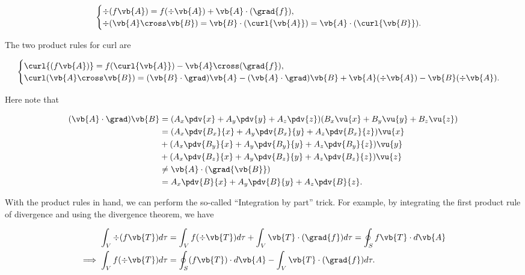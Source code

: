 \documentclass[english,a4paper,12pt]{report}
\begin{document}
\begin{equation}
\begin{cases} 
	\div{(f\vb{A})} = f(\div{\vb{A}}) + \vb{A} \cdot (\grad{f}), \\
	\div (\vb{A} \cross \vb{B}) = \vb{B} \cdot (\curl {\vb{A}}) = \vb{A} \cdot (\curl{\vb{B}}). 
\end{cases}
\end{equation}

	
The two product rules for curl are
	
\begin{equation}
\begin{cases} 
	\curl{(f\vb{A})} = f(\curl{\vb{A}}) - \vb{A} \cross (\grad{f}), \\
	\curl (\vb{A} \cross \vb{B}) = (\vb{B} \cdot \grad)\vb{A} - (\vb{A} \cdot \grad)\vb{B} + \vb{A}(\div{\vb{A}}) - \vb{B}(\div{\vb{A}}). 
\end{cases}
\end{equation}

	
Here note that

\begin{equation} 
	\begin{aligned} 
		(\vb{A} \cdot \grad) \vb{B} &= (A_x\pdv{x} + A_y\pdv{y} + A_z\pdv{z})(B_x\vu{x} + B_y\vu{y} + B_z\vu{z}) \\ &= (A_x\pdv{B_x}{x} + A_y\pdv{B_x}{y} + A_z\pdv{B_x}{z})\vu{x} \\ &+ (A_x\pdv{B_y}{x} + A_y\pdv{B_y}{y} + A_z\pdv{B_y}{z})\vu{y} \\ &+ (A_x\pdv{B_z}{x} + A_y\pdv{B_z}{y} + A_z\pdv{B_z}{z})\vu{z} \\ &\neq \vb{A} \cdot (\grad{\vb{B}}) \\ &= A_x\pdv{B}{x} + A_y\pdv{B}{y} + A_z\pdv{B}{z} .
	\end{aligned} 
\end{equation}
	
With the product rules in hand, we can perform the so-called ``Integration by part'' trick. For example, by integrating the first product rule of divergence and using the divergence theorem, we have
	
\begin{equation} 
	\begin{aligned}
	\int_{V} \div{(f\vb{T})} d\tau &= \int_{V} f(\div{\vb{T}}) d\tau + \int_{V} \vb{T} \cdot (\grad{f}) d\tau = \oint_{S} f\vb{T} \cdot d\vb{A} \\
	\implies \int_{V} f(\div{\vb{T}}) d\tau &= \oint_{S} (f\vb{T}) \cdot d\vb{A} - \int_{V} \vb{T} \cdot (\grad{f}) d\tau. 
	\end{aligned}
\end{equation}
	
\end{document}
